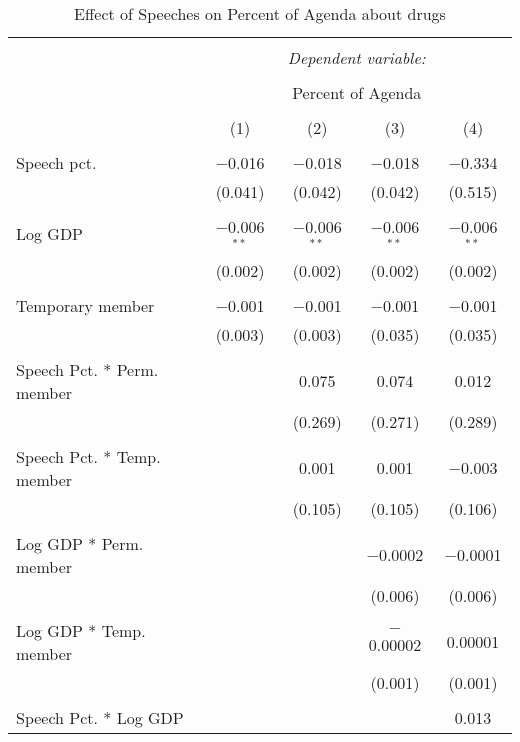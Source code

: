 
\begin{table}[!htbp] \centering 
  \caption{Effect of Speeches on Percent of Agenda about  drugs} 
  \label{} 
\begin{tabular}{@{\extracolsep{5pt}}lcccc} 
\\[-1.8ex]\hline 
\hline \\[-1.8ex] 
 & \multicolumn{4}{c}{\textit{Dependent variable:}} \\ 
\cline{2-5} 
\\[-1.8ex] & \multicolumn{4}{c}{Percent of Agenda} \\ 
\\[-1.8ex] & (1) & (2) & (3) & (4)\\ 
\hline \\[-1.8ex] 
 Speech pct. & $-$0.016 & $-$0.018 & $-$0.018 & $-$0.334 \\ 
  & (0.041) & (0.042) & (0.042) & (0.515) \\ 
  & & & & \\ 
 Log GDP & $-$0.006$^{**}$ & $-$0.006$^{**}$ & $-$0.006$^{**}$ & $-$0.006$^{**}$ \\ 
  & (0.002) & (0.002) & (0.002) & (0.002) \\ 
  & & & & \\ 
 Temporary member & $-$0.001 & $-$0.001 & $-$0.001 & $-$0.001 \\ 
  & (0.003) & (0.003) & (0.035) & (0.035) \\ 
  & & & & \\ 
 Speech Pct. * Perm. member &  & 0.075 & 0.074 & 0.012 \\ 
  &  & (0.269) & (0.271) & (0.289) \\ 
  & & & & \\ 
 Speech Pct. * Temp. member &  & 0.001 & 0.001 & $-$0.003 \\ 
  &  & (0.105) & (0.105) & (0.106) \\ 
  & & & & \\ 
 Log GDP * Perm. member &  &  & $-$0.0002 & $-$0.0001 \\ 
  &  &  & (0.006) & (0.006) \\ 
  & & & & \\ 
 Log GDP * Temp. member &  &  & $-$0.00002 & 0.00001 \\ 
  &  &  & (0.001) & (0.001) \\ 
  & & & & \\ 
 Speech Pct. * Log GDP &  &  &  & 0.013 \\ 

\end{tabular}
\end{table}
